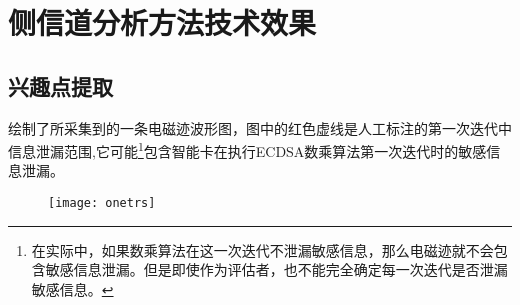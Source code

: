 {	\section{侧信道分析方法技术效果}
	\subsection{兴趣点提取}
	
	绘制了所采集到的一条电磁迹波形图，图中的红色虚线是人工标注的第一次迭代中信息泄漏范围,它可能\footnote{在实际中，如果数乘算法在这一次迭代不泄漏敏感信息，那么电磁迹就不会包含敏感信息泄漏。但是即使作为评估者，也不能完全确定每一次迭代是否泄漏敏感信息。}包含智能卡在执行ECDSA数乘算法第一次迭代时的敏感信息泄漏。%
	
	\begin{figure}[!h]
		\begin{center}
			\texttt{[image: onetrs]}
			\label{fig:onetrs}
		\end{center}
	\end{figure}
	
}
